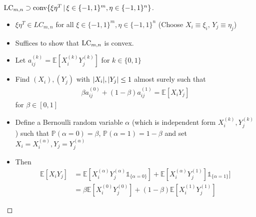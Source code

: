 \begin{frame}
	\begin{proof}[$   \textup{LC}_{m,n}  \supset \textup{conv} \{  \xi\eta^T \, | \, \xi \in \{-1,1\}^m, \eta \in \{-1,1\}^n     \} $]
		\begin{itemize}
			 \item<1-> $ \xi \eta^T \in LC_{m,n}  $ for all $\xi \in \{-1,1\}^m, \eta \in \{-1,1\}^n   $   
			 	(Choose $ X_i \equiv \xi_i, \, Y_j \equiv \eta_j $)
			\item<2-> Suffices to show that $ \textup{LC}_{m,n} $ is convex. 
			\item <3->Let $ a_{ij}^{(k)} = \mathbb{E}[X_i^{(k)}Y_{j}^{(k)}] $ for $ k \in \{0,1\} $
			\item<4-> Find $ (X_i),(Y_j) $ with $ {\left|{X_i}\right|},{\left|{Y_j}\right|} \le 1 $ almost surely such that
		\begin{align*}
				\beta a_{ij}^{(0)}+ (1-\beta)a_{ij}^{(1)} = \mathbb{E}[X_iY_j]
		\end{align*}
			for $ \beta \in [0,1] $
		\item<5-> Define a Bernoulli random variable $ \alpha $ (which is independent form $ X_i^{(k)},Y_j^{(k)} $) such that $ \mathbb{P}(\alpha = 0) = \beta $, $ \mathbb{P}(\alpha = 1) = 1 - \beta$ and set $ X_i = X_i^{(\alpha)}, Y_j = Y_j^{(\alpha)} $
		\item<6-> Then 
			\begin{align*}
			\mathbb{E}[X_iY_j] &= \mathbb{E}[X_i^{(\alpha)}Y_j^{(\alpha)}  \mathds{1}_{ \{\alpha = 0\}}] + \mathbb{E}[X_i^{(\alpha)}Y_j^{(1)}]\mathds{1}_{\{\alpha = 1\}}] \\
			&= \beta \mathbb{E}[X_i^{(0)}Y_j^{(0)} ] + (1-\beta) \mathbb{E}[X_i^{(1)}Y_j^{(1)}]
			\end{align*}
		\end{itemize}
	\end{proof}
\end{frame}


